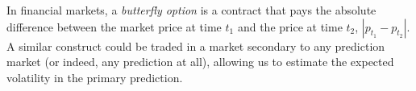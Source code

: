 \documentclass[sigconf,anonymous]{aamas}   %
\newcommand{\rupert}[1]{\ifnum\Chatty=1 \textcolor{red}   {Rupert: [#1]} \fi}
\begin{document}
In financial markets, a \emph{butterfly option} is a contract that pays the absolute difference between the market price at time $t_1$ and the price at time $t_2$, $|p_{t_1}-p_{t_2}|$. A similar construct could be traded in a market secondary to any prediction market (or indeed, any prediction at all), allowing us to estimate the expected volatility in the primary prediction. 




\end{document}
